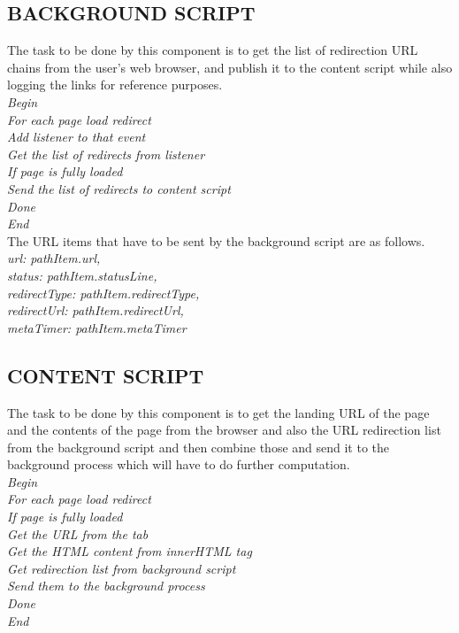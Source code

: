 \subsection{BACKGROUND SCRIPT}
The task to be done by this component is to get the list of redirection URL chains from the user's web browser, and publish it to the content script while also logging the links for reference purposes.\\
\null\quad\textit{Begin}\\
\null\quad\quad\textit{For each page load redirect}\\
\null\quad\quad\quad\textit{Add listener to that event}\\
\null\quad\quad\quad\textit{Get the list of redirects from listener}\\
\null\quad\quad\quad\textit{If page is fully loaded }\\
\null\quad\quad\quad\quad\textit{Send the list of redirects to content script}\\
\null\quad\quad\textit{Done}\\
\null\quad\textit{End}\\

The URL items that have to be sent by the background script are as follows.\\
\null\quad\textit{url: pathItem.url,}\\
\null\quad\textit{status: pathItem.statusLine,}\\
\null\quad\textit{redirectType: pathItem.redirectType,}\\
\null\quad\textit{redirectUrl: pathItem.redirectUrl,}\\
\null\quad\textit{metaTimer: pathItem.metaTimer}\\

\subsection{CONTENT SCRIPT}
The task to be done by this component is to get the landing URL of the page and the contents of the page from the browser and also the URL redirection list from the background script and then combine those and send it to the background process which will have to do further computation.\\
\null\quad\textit{Begin}\\
\null\quad\quad\textit{For each page load redirect}\\
\null\quad\quad\quad\textit{If page is fully loaded}\\
\null\quad\quad\quad\quad\textit{Get the URL from the tab}\\
\null\quad\quad\quad\quad\textit{Get the HTML content from innerHTML tag}\\
\null\quad\quad\quad\quad\textit{Get redirection list from background script}\\
\null\quad\quad\quad\quad\textit{Send them to the background process}\\
\null\quad\quad\textit{Done}\\
\null\quad\textit{End}\\

